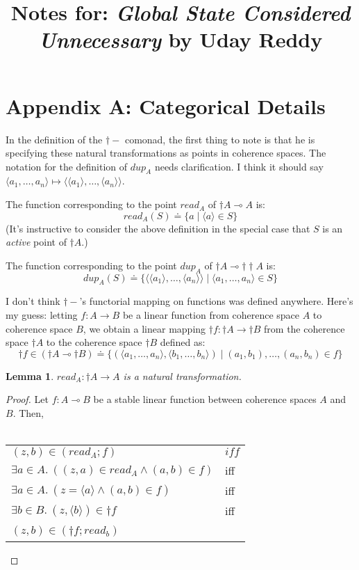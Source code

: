 \documentclass{article}
\title{Notes for: \emph{Global State Considered Unnecessary} by Uday Reddy}
\newtheorem{lemma}{Lemma}
\begin{document}
\maketitle


\section*{Appendix A: Categorical Details}

In the definition of the $\dagger-$ comonad, the first thing to note is that he is specifying these natural transformations as points in coherence spaces. The notation for the definition of $\mathit{dup}_A$ needs clarification. I think it should say $\langle a_1, \ldots, a_n \rangle \mapsto \langle \langle a_1 \rangle, \ldots, \langle a_n \rangle \rangle$.

The function corresponding to the point $\mathit{read}_A$ of 
$\dagger A \multimap A$ is:
$$\mathit{read_A}(S) \doteq \{ a \mid \langle a \rangle \in S \}$$
(It's instructive to consider the above definition in the special case that $S$ is an \emph{active} point of $\dagger A$.)

The function corresponding to the point $\mathit{dup}_A$ of $\dagger A \multimap \dagger \dagger A$ is:
$$\mathit{dup}_A(S) \doteq \{ \langle \langle a_1 \rangle, \ldots, \langle a_n \rangle \rangle \mid \langle a_1, \ldots, a_n \rangle \in S \} $$

I don't think $\dagger -$'s functorial mapping on functions was defined anywhere. Here's my guess: letting $f : A \to B$ be a linear function from coherence space $A$ to coherence space $B$, we obtain a linear mapping $\dagger f : \dagger A \to \dagger B$ from the coherence space $\dagger A$ to the coherence space $\dagger B$ defined as:
$$\dagger f \in (\dagger A \multimap \dagger B) \doteq \{ ( \langle a_1,\ldots,a_n \rangle, \langle b_1, \ldots, b_n \rangle)  \mid (a_1,b_1),\ldots,(a_n,b_n) \in f \}$$
 
\begin{lemma}
$\mathit{read_A} : \dagger A \to A$ is a natural transformation.
\end{lemma}

\begin{proof}
Let $f : A \multimap B$ be a stable linear function between coherence spaces $A$ and $B$. Then,\\~\\
\begin{tabular}{ll}
$(z,b) \in (\mathit{read}_A;f)$ & $\mathit{iff}$ \\
$\exists a \in A.~((z,a) \in \mathit{read}_A \wedge (a,b) \in f) $ & iff \\
$\exists a \in A.~(z = \langle a \rangle \wedge (a,b) \in f)$ & iff \\

$\exists b \in B.~(z,\langle b \rangle) \in \dagger f$ & iff \\
$(z,b) \in (\dagger f;\mathit{read}_b)$ & ~ 
\end{tabular} 
\end{proof}
\end{document}
